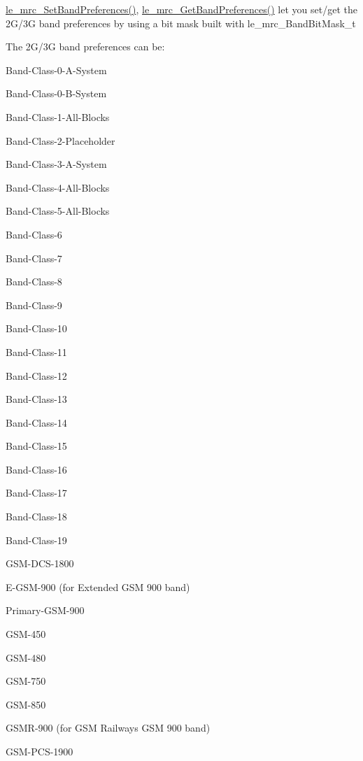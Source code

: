\hyperlink{le__mrc__interface_8h_ac808b4dc721e031566da92e00663c027}{le\+\_\+mrc\+\_\+\+Set\+Band\+Preferences()}, \hyperlink{le__mrc__interface_8h_a04418f56480070ba6c4f3d176dafaa37}{le\+\_\+mrc\+\_\+\+Get\+Band\+Preferences()} let you set/get the 2\+G/3G band preferences by using a bit mask built with {\ttfamily le\+\_\+mrc\+\_\+\+Band\+Bit\+Mask\+\_\+t} 

The 2\+G/3G band preferences can be\+:
\begin{DoxyItemize}
\item Band-\/\+Class-\/0-\/\+A-\/\+System
\item Band-\/\+Class-\/0-\/\+B-\/\+System
\item Band-\/\+Class-\/1-\/\+All-\/\+Blocks
\item Band-\/\+Class-\/2-\/\+Placeholder
\item Band-\/\+Class-\/3-\/\+A-\/\+System
\item Band-\/\+Class-\/4-\/\+All-\/\+Blocks
\item Band-\/\+Class-\/5-\/\+All-\/\+Blocks
\item Band-\/\+Class-\/6
\item Band-\/\+Class-\/7
\item Band-\/\+Class-\/8
\item Band-\/\+Class-\/9
\item Band-\/\+Class-\/10
\item Band-\/\+Class-\/11
\item Band-\/\+Class-\/12
\item Band-\/\+Class-\/13
\item Band-\/\+Class-\/14
\item Band-\/\+Class-\/15
\item Band-\/\+Class-\/16
\item Band-\/\+Class-\/17
\item Band-\/\+Class-\/18
\item Band-\/\+Class-\/19
\item G\+S\+M-\/\+D\+C\+S-\/1800
\item E-\/\+G\+S\+M-\/900 (for Extended G\+SM 900 band)
\item Primary-\/\+G\+S\+M-\/900
\item G\+S\+M-\/450
\item G\+S\+M-\/480
\item G\+S\+M-\/750
\item G\+S\+M-\/850
\item G\+S\+M\+R-\/900 (for G\+SM Railways G\+SM 900 band)
\item G\+S\+M-\/\+P\+C\+S-\/1900

\end{DoxyItemize}
